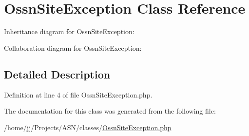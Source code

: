 \hypertarget{class_ossn_site_exception}{}\section{Ossn\+Site\+Exception Class Reference}
\label{class_ossn_site_exception}


Inheritance diagram for Ossn\+Site\+Exception\+:


Collaboration diagram for Ossn\+Site\+Exception\+:


\subsection{Detailed Description}


Definition at line 4 of file Ossn\+Site\+Exception.\+php.



The documentation for this class was generated from the following file\+:\begin{DoxyCompactItemize}
\item 
/home/jj/\+Projects/\+A\+S\+N/classes/\hyperlink{_ossn_site_exception_8php}{Ossn\+Site\+Exception.\+php}\end{DoxyCompactItemize}
